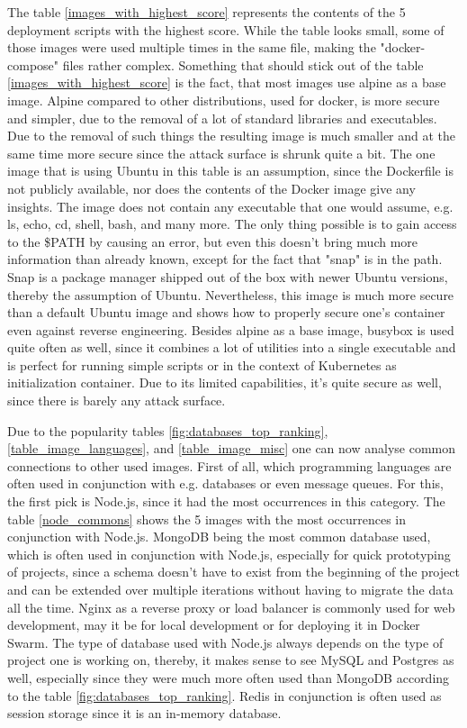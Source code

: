 The table \ref{images_with_highest_score} represents the contents of the 5 deployment scripts with the highest score. While the table looks small, some of those images were used multiple times in the same file, making the "docker-compose" files rather complex.
Something that should stick out of the table \ref{images_with_highest_score} is the fact, that most images use alpine as a base image. Alpine compared to other distributions, used for docker, is more secure and simpler, due to the removal of a lot of standard libraries and executables. Due to the removal of such things the resulting image is much smaller and at the same time more secure since the attack surface is shrunk quite a bit.
The one image that is using Ubuntu in this table is an assumption, since the Dockerfile is not publicly available, nor does the contents of the Docker image give any insights. The image does not contain any executable that one would assume, e.g. ls, echo, cd, shell, bash, and many more. The only thing possible is to gain access to the \$PATH by causing an error, but even this doesn't bring much more information than already known, except for the fact that "snap" is in the path. Snap is a package manager shipped out of the box with newer Ubuntu versions, thereby the assumption of Ubuntu. Nevertheless, this image is much more secure than a default Ubuntu image and shows how to properly secure one's container even against reverse engineering.
Besides alpine as a base image, busybox is used quite often as well, since it combines a lot of utilities into a single executable and is perfect for running simple scripts or in the context of Kubernetes as initialization container. Due to its limited capabilities, it's quite secure as well, since there is barely any attack surface.

Due to the popularity tables \ref{fig:databases_top_ranking}, \ref{table_image_languages}, and \ref{table_image_misc} one can now analyse common connections to other used images. First of all, which programming languages are often used in conjunction with e.g. databases or even message queues.
For this, the first pick is Node.js, since it had the most occurrences in this category. The table \ref{node_commons} shows the 5 images with the most occurrences in conjunction with Node.js. MongoDB being the most common database used, which is often used in conjunction with Node.js, especially for quick prototyping of projects, since a schema doesn't have to exist from the beginning of the project and can be extended over multiple iterations without having to migrate the data all the time. Nginx as a reverse proxy or load balancer is commonly used for web development, may it be for local development or for deploying it in Docker Swarm. The type of database used with Node.js always depends on the type of project one is working on, thereby, it makes sense to see MySQL and Postgres as well, especially since they were much more often used than MongoDB according to the table \ref{fig:databases_top_ranking}. Redis in conjunction is often used as session storage since it is an in-memory database.

